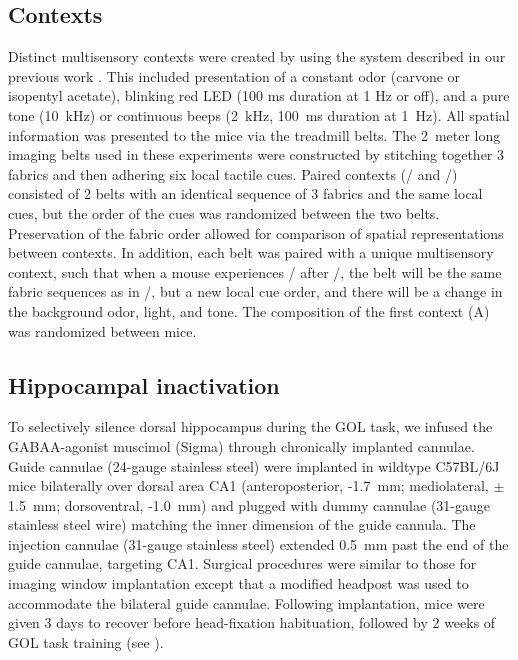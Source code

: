 \subsection{Contexts}\label{sec:methods:contexts}
Distinct multisensory contexts were created by using the system described in our previous work \citep{Lovett-Barron2014}. This included presentation of a constant odor (carvone or isopentyl acetate), blinking red LED (100 ms duration at 1 Hz or off), and a pure tone (10~kHz) or continuous beeps (2~kHz, 100~ms duration at 1~Hz). All spatial information was presented to the mice via the treadmill belts. The 2~meter long imaging belts used in these experiments were constructed by stitching together 3 fabrics and then adhering six local tactile cues. Paired contexts (\A/ and \Aprime/) consisted of 2 belts with an identical sequence of 3 fabrics and the same local cues, but the order of the cues was randomized between the two belts. Preservation of the fabric order allowed for comparison of spatial representations between contexts. In addition, each belt was paired with a unique multisensory context, such that when a mouse experiences \Aprime/ after \A/, the belt will be the same fabric sequences as in \A/, but a new local cue order, and there will be a change in the background odor, light, and tone. The composition of the first context (A) was randomized between mice.
\subsection{Hippocampal inactivation}
To selectively silence dorsal hippocampus during the GOL task, we infused the GABAA-agonist muscimol (Sigma) through chronically implanted cannulae. Guide cannulae (24-gauge stainless steel) were implanted in wildtype C57BL/6J mice bilaterally over dorsal area CA1 (anteroposterior, -1.7~mm; mediolateral, $\pm$1.5~mm; dorsoventral, -1.0~mm) and plugged with dummy cannulae (31-gauge stainless steel wire) matching the inner dimension of the guide cannula. The injection cannulae (31-gauge stainless steel) extended 0.5~mm past the end of the guide cannulae, targeting CA1. Surgical procedures were similar to those for imaging window implantation except that a modified headpost was used to accommodate the bilateral guide cannulae. Following implantation, mice were given 3 days to recover before head-fixation habituation, followed by 2 weeks of GOL task training (see ).

